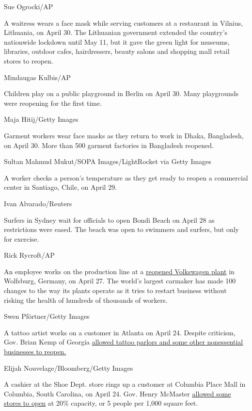 Sue Ogrocki/AP

A waitress wears a face mask while serving customers at a restaurant in
Vilnius, Lithuania, on April 30. The Lithuanian government extended the
country's nationwide lockdown until May 11, but it gave the green light
for museums, libraries, outdoor cafes, hairdressers, beauty salons and
shopping mall retail stores to reopen.

Mindaugas Kulbis/AP

Children play on a public playground in Berlin on April 30. Many
playgrounds were reopening for the first time.

Maja Hitij/Getty Images

Garment workers wear face masks as they return to work in Dhaka,
Bangladesh, on April 30. More than 500 garment factories in Bangladesh
reopened.

Sultan Mahmud Mukut/SOPA Images/LightRocket via Getty Images

A worker checks a person's temperature as they get ready to reopen a
commercial center in Santiago, Chile, on April 29.

Ivan Alvarado/Reuters

Surfers in Sydney wait for officials to open Bondi Beach on April 28 as
restrictions were eased. The beach was open to swimmers and surfers, but
only for exercise.

Rick Rycroft/AP

An employee works on the production line at a
\href{https://edition.cnn.com/2020/04/27/business/volkswagen-restart-production-wolfsburg/index.html}{reopened
Volkswagen plant} in Wolfsburg, Germany, on April 27. The world's
largest carmaker has made 100 changes to the way its plants operate as
it tries to restart business without risking the health of hundreds of
thousands of workers.

Swen Pförtner/Getty Images

A tattoo artist works on a customer in Atlanta on April 24. Despite
criticism, Gov. Brian Kemp of Georgia
\href{https://www.cnn.com/2020/04/24/us/georgia-coronavirus-reopening-businesses-friday/index.html}{allowed
tattoo parlors and some other nonessential businesses to reopen.}

Elijah Nouvelage/Bloomberg/Getty Images

A cashier at the Shoe Dept. store rings up a customer at Columbia Place
Mall in Columbia, South Carolina, on April 24. Gov. Henry McMaster
\href{https://www.cnn.com/2020/04/20/us/coronavirus-updates-monday/index.html}{allowed
some stores to open} at 20\% capacity, or 5 people per 1,000 square
feet.

